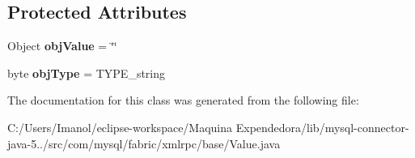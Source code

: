 \subsection*{Protected Attributes}
\begin{DoxyCompactItemize}
\item 
\mbox{\label{classcom_1_1mysql_1_1fabric_1_1xmlrpc_1_1base_1_1_value_aff264a6c2f17f05c062fbb965ff2cc22}} 
Object {\bfseries obj\+Value} = \char`\"{}\char`\"{}
\item 
\mbox{\label{classcom_1_1mysql_1_1fabric_1_1xmlrpc_1_1base_1_1_value_aaf3738f1aa03c3fc6f87f32c8f070dac}} 
byte {\bfseries obj\+Type} = T\+Y\+P\+E\+\_\+string
\end{DoxyCompactItemize}


The documentation for this class was generated from the following file\+:\begin{DoxyCompactItemize}
\item 
C\+:/\+Users/\+Imanol/eclipse-\/workspace/\+Maquina Expendedora/lib/mysql-\/connector-\/java-\/5../src/com/mysql/fabric/xmlrpc/base/Value.\+java\end{DoxyCompactItemize}
